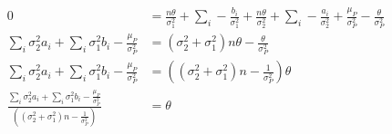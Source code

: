\documentclass[a4paper]{scrartcl}
\begin{document}
    \begin{align*}
      0 &= \frac{n \theta }{\sigma_1^2} + \sum_i - \frac{b_i}{\sigma_1^2} + \frac{n \theta }{\sigma_2^2} + \sum_i - \frac{a_i}{\sigma_2^2} + \frac{\mu_P}{\sigma_P^2} - \frac{\theta}{\sigma_P^2}\\
      \sum_i \sigma_2^2 a_i + \sum_i \sigma_1^2 b_i - \frac{\mu_P}{\sigma_P^2}&= (\sigma_2^2 + \sigma_1^2) n\theta - \frac{\theta}{\sigma_P^2}\\
      \sum_i \sigma_2^2 a_i + \sum_i \sigma_1^2 b_i - \frac{\mu_P}{\sigma_P^2}&= ((\sigma_2^2 + \sigma_1^2) n - \frac{1}{\sigma_P^2}) \theta\\
      \frac{\sum_i \sigma_2^2 a_i + \sum_i \sigma_1^2 b_i - \frac{\mu_P}{\sigma_P^2}}{((\sigma_2^2 + \sigma_1^2) n - \frac{1}{\sigma_P^2}) }&= \theta
    \end{align*}
\end{document}
